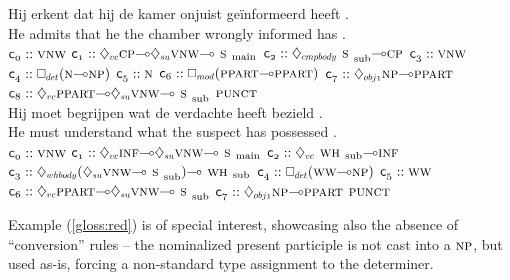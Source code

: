 \begin{exe}
 \label{gloss:green}
\glll Hij erkent dat hij de kamer onjuist ge\"informeerd heeft .\\
He admits that he the chamber wrongly informed has .\\
	$\con{0}::\vnw[s]$
	$\con{1}::\ddia{vc}\cp[s]\li\ddia{su}\vnw[s]\li\smain[s]$
	$\con{2}::\ddia{cmpbody}\ssub[s]\li\cp[s]$
	$\con{3}::\vnw[s]$
	$\con{4}::\dbox{det}(\n[s]\li\np[s])$
	$\con{5}::\n[s]$
	$\con{6}::\dbox{mod}(\ppart[s]\li\ppart[s])$
	$\con{7}::\ddia{obj1}\np[s]\li\ppart[s]$
	$\con{8}::\ddia{vc}\ppart[s]\li\ddia{su}\vnw[s]\li\ssub[s]$
	$\punct[s]$\\
 \label{gloss:red}
\glll Hij moet begrijpen wat de verdachte heeft bezield .\\
He must understand what the suspect has possessed .\\
	$\con{0}::\vnw[s]$
	$\con{1}::\ddia{vc}\infp[s]\li\ddia{su}\vnw[s]\li\smain[s]$
	$\con{2}::\ddia{vc}\whsub[s]\li\infp[s]$
	$\con{3}::\ddia{whbody}(\ddia{su}\vnw[s]\li\ssub[s])\li\whsub[s]$
	$\con{4}::\dbox{det}(\ww[s]\li\np[s])$
	$\con{5}::\ww[s]$
	$\con{6}::\ddia{vc}\ppart[s]\li\ddia{su}\vnw[s]\li\ssub[s]$
	$\con{7}::\ddia{obj1}\np[s]\li\ppart[s]$
	$\punct[s]$\\
\end{exe}
Example (\ref{gloss:red}) is of special interest, showcasing also the absence of ``conversion'' rules --  the nominalized present participle  is not cast into a $\np[s]$, but used as-is, forcing a non-standard type assignment to the determiner.

